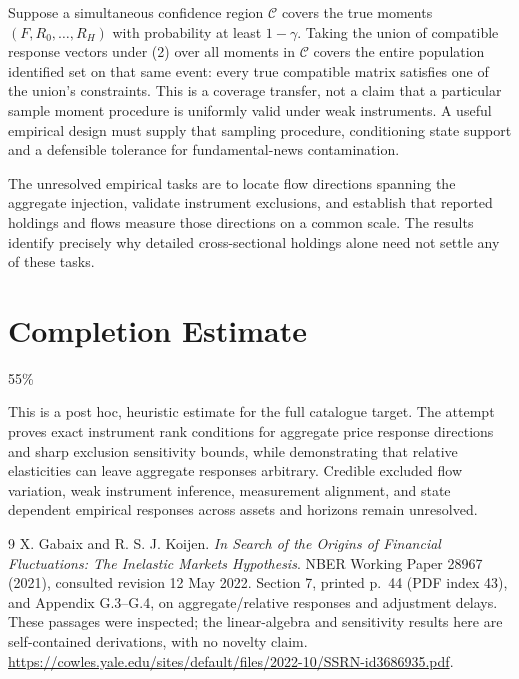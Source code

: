 \documentclass[11pt]{article}
\theoremstyle{remark}
\begin{document}
Suppose a simultaneous confidence region $\mathcal C$ covers the true
moments $(F,R_0,\ldots,R_H)$ with probability at least $1-\gamma$.
Taking the union of compatible response vectors under (2) over all
moments in $\mathcal C$ covers the entire population identified set on
that same event: every true compatible matrix satisfies one of the union's
constraints. This is a coverage transfer, not a claim that a particular
sample moment procedure is uniformly valid under weak instruments.
A useful empirical design must supply that sampling procedure, conditioning
state support and a defensible tolerance for fundamental-news contamination.

The unresolved empirical tasks are to locate flow directions spanning the
aggregate injection, validate instrument exclusions, and establish that
reported holdings and flows measure those directions on a common scale.
The results identify precisely why detailed cross-sectional holdings alone
need not settle any of these tasks.

\section{Completion Estimate}
55\%

This is a post hoc, heuristic estimate for the full catalogue target.
The attempt proves exact instrument rank conditions for aggregate price response directions and sharp exclusion sensitivity bounds, while demonstrating that relative elasticities can leave aggregate responses arbitrary. Credible excluded flow variation, weak instrument inference, measurement alignment, and state dependent empirical responses across assets and horizons remain unresolved.

\begin{thebibliography}{9}
 X. Gabaix and R. S. J. Koijen.
\emph{In Search of the Origins of Financial Fluctuations: The Inelastic
Markets Hypothesis}. NBER Working Paper 28967 (2021), consulted revision
12 May 2022. Section 7, printed p.~44 (PDF index 43), and Appendix G.3--G.4,
on aggregate/relative responses and adjustment delays. These passages
were inspected; the linear-algebra and sensitivity results here are
self-contained derivations, with no novelty claim.
\url{https://cowles.yale.edu/sites/default/files/2022-10/SSRN-id3686935.pdf}.
\end{thebibliography}
\end{document}
